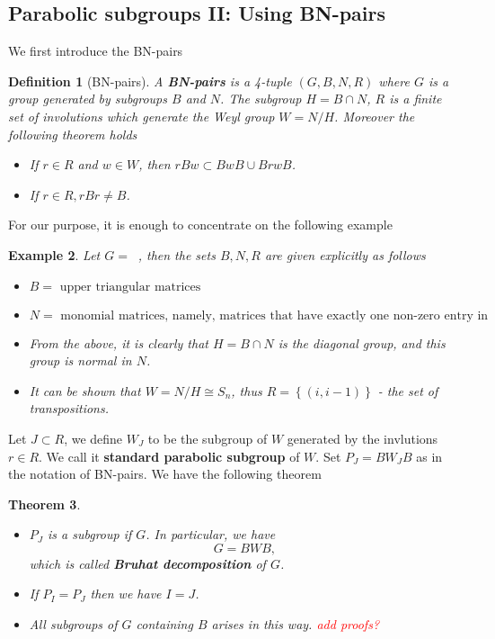 \documentclass[12pt]{article} %
\newtheorem{definition}{Definition}[section]
\newtheorem{theorem}[definition]{Theorem}
\newtheorem{example}[definition]{Example}
\DeclareMathOperator{\GLn}{\text{GL}_n(\mathbb{R})}
\begin{document}
\subsection{Parabolic subgroups II: Using BN-pairs}
We first introduce the BN-pairs
\begin{definition}[BN-pairs]
    A \textbf{BN-pairs} is a 4-tuple $(G,B,N,R)$ where $G$ is a group generated by subgroups $B$ and $N$.
    The subgroup $H = B \cap N$, $R$ is a finite set of involutions which generate the \textit{Weyl group} $W= N/H$. Moreover
    the following theorem holds
    \begin{itemize}
        \item If $ r \in R$ and $w \in W$, then $rBw \subset BwB \cup BrwB$.
        \item If $r \in R, rBr \ne B$.
    \end{itemize}
\end{definition}
For our purpose, it is enough to concentrate on the following example
\begin{example}
    Let $G = \GLn$, then the sets $B,N,R$ are given explicitly as follows
    \begin{itemize}
        \item $B = \text{ upper triangular matrices}$
        \item $N = \text{ monomial matrices, namely, matrices that have exactly one non-zero entry in each row and column}$
        \item From the above, it is clearly that $H = B \cap N$ is the diagonal group, and this group is normal in $N$.
        \item It can be shown that $W = N/H \cong S_n$, thus $R = \left\lbrace (i,i-1)\right\rbrace $ - the set of transpositions.
    \end{itemize}
\end{example}
Let $J \subset R$, we define $W_J$ to be the subgroup of $W$ generated by the invlutions
$r \in R$. We call it \textbf{standard parabolic subgroup} of $W$. Set $P_J = BW_JB$ as in the notation of
BN-pairs. We have the following theorem
\begin{theorem}
    \hfill
    \begin{itemize}
        \item $P_J$ is a subgroup if $G$. In particular, we have
              \[G = BWB,\]
              which is called \textbf{Bruhat decomposition} of $G$.
        \item If $P_I=P_J$ then we have $I=J$.
        \item All subgroups of $G$ containing $B$ arises in this way. \textcolor{red}{add proofs?}
    \end{itemize}
\end{theorem}
\end{document}
